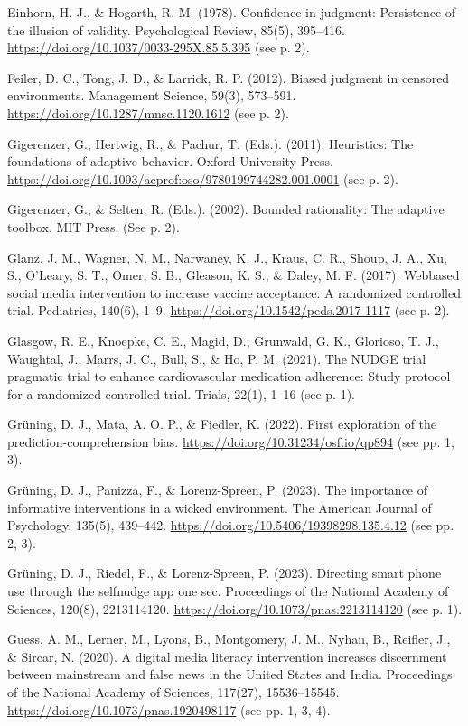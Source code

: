 \documentclass[reflection, authordate]{jote-new-article}
\begin{document}
Einhorn, H. J., \& Hogarth, R. M. (1978). Confidence in judgment: Persistence of the illusion of validity. Psychological Review, 85(5), 395–416. \url{https://doi.org/10.1037/0033-295X.85.5.395} (see p. 2).

Feiler, D. C., Tong, J. D., \& Larrick, R. P. (2012). Biased judgment in censored environments. Management Science, 59(3), 573–591. \url{https://doi.org/10.1287/mnsc.1120.1612} (see p. 2).

Gigerenzer, G., Hertwig, R., \& Pachur, T. (Eds.). (2011). Heuristics: The foundations of adaptive behavior. Oxford University Press. \url{https://doi.org/10.1093/acprof:oso/9780199744282.001.0001} (see p. 2).

Gigerenzer, G., \& Selten, R. (Eds.). (2002). Bounded rationality: The adaptive toolbox. MIT Press. (See p. 2).

Glanz, J. M., Wagner, N. M., Narwaney, K. J., Kraus, C. R., Shoup, J. A., Xu, S., O’Leary, S. T., Omer, S. B., Gleason, K. S., \& Daley, M. F. (2017). Webbased social media intervention to increase vaccine acceptance: A randomized controlled trial. Pediatrics, 140(6), 1–9. \url{https://doi.org/10.1542/peds.2017-1117} (see p. 2).

Glasgow, R. E., Knoepke, C. E., Magid, D., Grunwald, G. K., Glorioso, T. J., Waughtal, J., Marrs, J. C., Bull, S., \& Ho, P. M. (2021). The NUDGE trial pragmatic trial to enhance cardiovascular medication adherence: Study protocol for a randomized controlled trial. Trials, 22(1), 1–16 (see p. 1).

Grüning, D. J., Mata, A. O. P., \& Fiedler, K. (2022). First exploration of the prediction-comprehension bias. \url{https://doi.org/10.31234/osf.io/qp894} (see pp. 1, 3).

Grüning, D. J., Panizza, F., \& Lorenz-Spreen, P. (2023). The importance of informative interventions in
a wicked environment. The American Journal of Psychology, 135(5), 439–442. \url{https://doi.org/10.5406/19398298.135.4.12} (see pp. 2, 3).

Grüning, D. J., Riedel, F., \& Lorenz-Spreen, P. (2023). Directing smart phone use through the selfnudge app one sec. Proceedings of the National Academy of Sciences, 120(8), 2213114120. \url{https://doi.org/10.1073/pnas.2213114120} (see p. 1).

Guess, A. M., Lerner, M., Lyons, B., Montgomery, J. M., Nyhan, B., Reifler, J., \& Sircar, N. (2020). A digital media literacy intervention increases discernment between mainstream and false news in the United States and India. Proceedings of the National Academy of Sciences, 117(27), 15536–15545. \url{https://doi.org/10.1073/pnas.1920498117} (see
pp. 1, 3, 4).
\end{document}
